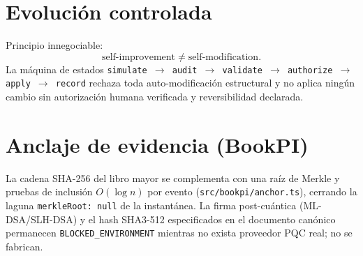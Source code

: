 \documentclass[11pt,a4paper]{article}
\begin{document}
\section{Evolución controlada}
Principio innegociable:
\[
  \text{self-improvement} \neq \text{self-modification}.
\]
La máquina de estados \texttt{simulate \(\to\) audit \(\to\) validate \(\to\) authorize
\(\to\) apply \(\to\) record} rechaza toda auto-modificación estructural y no aplica ningún
cambio sin autorización humana verificada y reversibilidad declarada.

\section{Anclaje de evidencia (BookPI)}
La cadena SHA-256 del libro mayor se complementa con una raíz de Merkle y pruebas de
inclusión \(O(\log n)\) por evento (\texttt{src/bookpi/anchor.ts}), cerrando la laguna
\texttt{merkleRoot: null} de la instantánea. La firma post-cuántica (ML-DSA/SLH-DSA) y el
hash SHA3-512 especificados en el documento canónico permanecen \texttt{BLOCKED\_ENVIRONMENT}
mientras no exista proveedor PQC real; no se fabrican.
\end{document}
